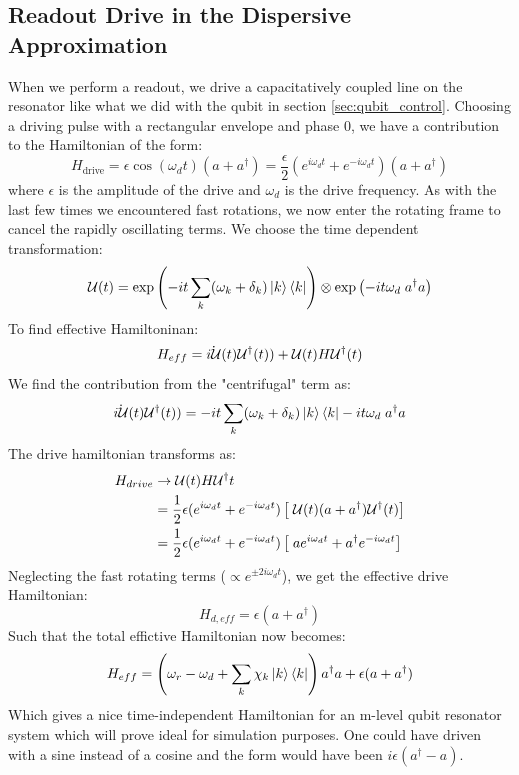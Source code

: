 \subsection{Readout Drive in the Dispersive Approximation}
When we perform a readout, we drive a capacitatively coupled line on the resonator like what we did with the qubit in section \ref{sec:qubit_control}. Choosing a driving pulse with a rectangular envelope and phase $0$, we have a contribution to the Hamiltonian of the form:
\begin{equation}
    H_{\text{drive}} = \epsilon\cos(\omega_d t)(a + a^\dagger) = \frac{\epsilon}{2} \left(e^{i\omega_d t} + e^{-i\omega_d t}\right)(a + a^\dagger)    
\end{equation}
where $\epsilon$ is the amplitude of the drive and $\omega_d$ is the drive frequency. As with the last few times we encountered fast rotations, we now enter the rotating frame to cancel the rapidly oscillating terms. We choose the time dependent transformation:
\begin{equation}
    \mathcal{U}(t) = \exp\left(- i t \sum_k (\omega_k + \delta_k) \ket{k}\bra{k}\right) \otimes \exp \left(- i t \omega_d \;  a^\dagger a \right)
\end{equation}
To find effective Hamiltoninan:
\begin{equation}
    H_{eff} = \dot{i \mathcal{U}}{(t)}\mathcal{U}^\dagger(t)) + \mathcal{U}(t) H \mathcal{U}^\dagger(t)
\end{equation}
We find the contribution from the "centrifugal" term as:
\begin{equation}
    \dot{i \mathcal{U}}{(t)}\mathcal{U}^\dagger(t)) = - i t \sum_k (\omega_k + \delta_k) \ket{k}\bra{k} - it \omega_d \;  a^\dagger a
\end{equation}
The drive hamiltonian transforms as:
\begin{align*}
    H_{drive} &\to \mathcal{U}(t) H_{} \mathcal{U}^\dagger{t} \\
    &= \frac12 \epsilon (e^{i\omega_d t} + e^{-i\omega_d t}) \left[ \; \mathcal{U}(t)  (a + a^\dagger) \mathcal{U}^\dagger(t)\right] \\
    &= \frac12 \epsilon (e^{i\omega_d t} + e^{-i\omega_d t}) \left[ \;a e^{i \omega_d t} + a^\dagger e^{-i \omega_d t} \right]
\end{align*}
Neglecting the fast rotating terms ($\propto e^{\pm 2i\omega_dt}$), we get the effective drive Hamiltonian:
\begin{equation}
    H_{d, eff} = \epsilon(a + a^\dagger)
\end{equation}
Such that the total effictive Hamiltonian now becomes:
\begin{equation}
    H_{eff} =  \left(\omega_r - \omega_d + \sum_k \chi_k \ket{k}\bra{k}\right)a^\dagger a + \epsilon(a + a^\dagger)
\end{equation}
Which gives a nice time-independent Hamiltonian for an m-level qubit resonator system which will prove ideal for simulation purposes. One could have driven with a sine instead of a cosine and the form would have been $i\epsilon(a^\dagger - a)$. 



